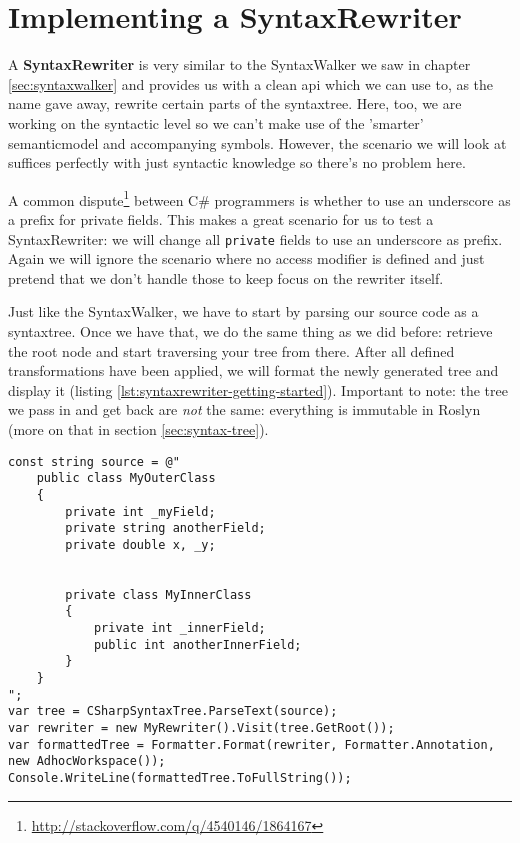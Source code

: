 \chapter{Implementing a SyntaxRewriter}
\label{sec:syntaxrewriter}

A \textbf{SyntaxRewriter} is very similar to the SyntaxWalker we saw in chapter \ref{sec:syntaxwalker} and provides us with a clean \gls{api} which we can use to, as the name gave away, rewrite certain parts of the \gls{syntaxtree}. Here, too, we are working on the syntactic level so we can't make use of the 'smarter' \gls{semanticmodel} and accompanying symbols. However, the scenario we will look at suffices perfectly with just syntactic knowledge so there's no problem here.

A common dispute\footnote{\url{http://stackoverflow.com/q/4540146/1864167}} between C\# programmers is whether to use an underscore as a prefix for private fields. This makes a great scenario for us to test a SyntaxRewriter: we will change all \texttt{private} fields to use an underscore as prefix. Again we will ignore the scenario where no access modifier is defined and just pretend that we don't handle those to keep focus on the rewriter itself.

Just like the SyntaxWalker, we have to start by parsing our source code as a \gls{syntaxtree}. Once we have that, we do the same thing as we did before: retrieve the root node and start traversing your tree from there. After all defined transformations have been applied, we will format the newly generated tree and display it (listing \ref{lst:syntaxrewriter-getting-started}). Important to note: the tree we pass in and get back are \textit{not} the same: everything is \gls{immutable} in Roslyn (more on that in section \ref{sec:syntax-tree}).

\clearpage

\begin{minipage}{\linewidth}
\begin{lstlisting}[label={lst:syntaxrewriter-getting-started}]
const string source = @"
	public class MyOuterClass
	{
	    private int _myField;
	    private string anotherField;
	    private double x, _y;
	    
	
	    private class MyInnerClass
	    {
	        private int _innerField;
	        public int anotherInnerField;
	    }
	}
";
var tree = CSharpSyntaxTree.ParseText(source);
var rewriter = new MyRewriter().Visit(tree.GetRoot());
var formattedTree = Formatter.Format(rewriter, Formatter.Annotation, new AdhocWorkspace());
Console.WriteLine(formattedTree.ToFullString());
\end{lstlisting}
\end{minipage}

